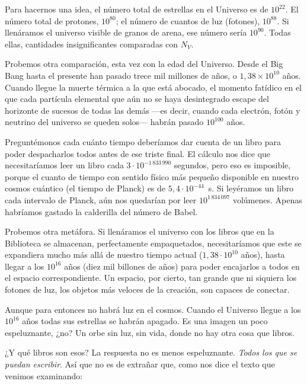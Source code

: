 \documentclass[11pt,a4paper]{article}
\begin{document}
 Para hacernos una idea, el número total de estrellas en el Universo es de $10^{22}$. El número total de protones, $10^{80}$; el número de cuantos de luz (fotones), $10^{88}$. Si llenáramos el universo visible de granos de arena, ese número sería $10^{90}$. Todas ellas, cantidades insignificantes comparadas con $N_V$. 
 
 Probemos otra comparación, esta vez con la edad del Universo. Desde el Big Bang hasta el presente han pasado trece mil millones de años, o $1{,}38 \times 10^{10}$ años. Cuando llegue la muerte térmica a la que está abocado, el momento fatídico en el que cada partícula elemental que aún no se haya desintegrado escape del horizonte de sucesos de todas las demás ---es decir, cuando cada electrón, fotón y neutrino del universo se queden solos--- habrán pasado $10^{100}$ años.

Preguntémonos cada cuánto tiempo deberíamos dar cuenta de un libro para poder despacharlos todos antes de ese triste final. El cálculo nos dice que necesitaríamos leer un libro cada $3\cdot 10^{-1\,833\,990}$ segundos, pero eso es imposible, porque el cuanto de tiempo con sentido físico más pequeño disponible en nuestro cosmos cuántico (el tiempo de Planck) es de $5{,}4 \cdot 10^{-44}$~s. Si leyéramos un libro cada intervalo de Planck, aún nos quedarían por leer $10^{1\,834\,097}$ volúmenes. Apenas habríamos gastado la calderilla del número de Babel.

Probemos otra metáfora. Si llenáramos el universo con los libros que en la Biblioteca se almacenan, perfectamente empaquetados, necesitaríamos que este se expandiera mucho más allá de nuestro tiempo actual ($1{,}38 \cdot 10^{10}$ años), hasta llegar a los $10^{16}$ años (diez mil billones de años) para poder encajarlos a todos en el espacio correspondiente. Un espacio, por cierto, tan grande que ni siquiera los fotones de luz, los objetos más veloces de la creación, son capaces de conectar. 

Aunque para entonces no habrá luz en el cosmos. Cuando el Universo llegue a los $10^{16}$ años todas sus estrellas se habrán apagado. Es una imagen un poco espeluznante, ¿no? Un orbe sin luz, sin vida, donde no hay otra cosa que libros.

¿Y qué libros son esos? La respuesta no es menos espeluznante. \emph{Todos los que se puedan escribir}. Así que no es de extrañar que, como nos dice el texto que venimos examinando:
\end{document}

